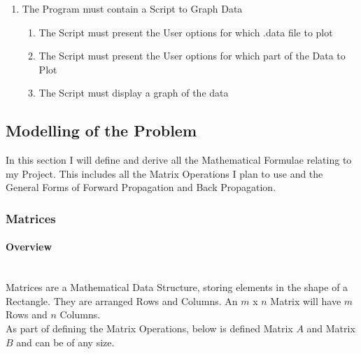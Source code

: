 \begin{flushleft}
\begin{enumerate}
                \item The Program must contain a Script to Graph Data
                \begin{enumerate}
                    \item The Script must present the User options for which .data file to plot
                    \item The Script must present the User options for which part of the Data to Plot
                    \item The Script must display a graph of the data
                \end{enumerate}
            \end{enumerate}
        \subsection{Modelling of the Problem}
            \large
            In this section I will define and derive all the Mathematical Formulae relating to my Project. This includes all the Matrix Operations 
            I plan to use and the General Forms of Forward Propagation and Back Propagation. \\

            \subsubsection{Matrices}
                \paragraph{Overview} \mbox{} \\
                Matrices are a Mathematical Data Structure, storing elements in the shape of a Rectangle. They are arranged Rows and Columns.
                An $m$ x $n$ Matrix will have $m$ Rows and $n$ Columns. \\
                \vspace{0.2cm}
                As part of defining the Matrix Operations, below is defined Matrix $A$ and Matrix $B$ and can be of any size. \\
                \vspace{0.5cm}


\end{flushleft}
